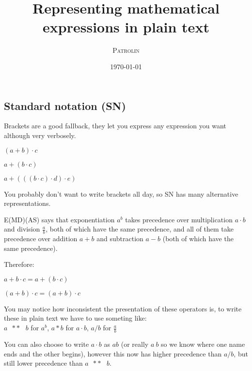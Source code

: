 \documentclass[twoside]{article}
\title{Representing mathematical expressions in plain text}
\author{\textsc{Patrolin}}
\date{\today}
\newcommand{\M}[1]{\scriptstyle{#1}} %
\newcommand{\T}[1]{\textrm{#1}} %
\newcommand{\F}[2]{\frac{#1}{#2}} %
\newcommand{\pow}{\T{ }\M{**}\T{ }}
\begin{document}
    \maketitle
    \thispagestyle{empty}

    \begin{multicols*}{2}
        \section{Standard notation (SN)}
            Brackets are a good fallback, they let you express any expression you want although very verbosely.\vspace{1px}\\
            \centerline{$ (a + b) \cdot c $}
            \centerline{$ a + (b \cdot c) $}
            \centerline{$ a + (((b \cdot c) \cdot d) \cdot e) $}
            \par\vspace{5px}
                You probably don't want to write brackets all day,
                so SN has many alternative representations.
                \par
                E(MD)(AS) says that exponentiation $a^b$ takes precedence
                over multiplication $a\cdot{}b$ and division $\F{a}{b}$, both of which have the same precedence,
                and all of them take precedence over addition $a+b$ and subtraction $a-b$ (both of which have the same precedence).
                \par
                Therefore:\vspace{2px}\\
                \centerline{$ a + b \cdot c = a + (b \cdot c) $}
                \centerline{$ (a + b) \cdot c = (a + b) \cdot c $}\vspace{-1px}
            \par\vspace{5px}
                You may notice how inconsistent the presentation of these operators is,
                to write these in plain text we have to use someting like:\\
                $a\pow{}b$ for $a^b$, $a*b$ for $a\cdot{}b$, $a/b$ for $\F{a}{b}$
                \par
                You can also choose to write $a\cdot{}b$ as $ab$
                (or really $a\ b$ so we know where one name ends and the other begins),
                however this now has higher precedence than $a/b$, but still lower precedence than $a\pow{}b$.
            \par\vspace{5px}

\end{multicols*}
\end{document}
